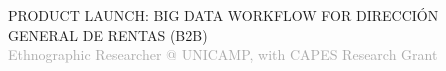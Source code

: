 \begin{cvtable}
%
	{
	}{
	 {\scriptsize PRODUCT LAUNCH: BIG DATA WORKFLOW FOR DIRECCIÓN GENERAL DE RENTAS
	 (B2B)
	 } \\
        }  
% 
%
%
	{%
	\textcolor{darkgray}{%
    Ethnographic Researcher \newline
    @ {\scriptsize UNICAMP},
    with
    {C\scriptsize APES}
    Research Grant
	}}
	{
	}
	{
}
\end{cvtable}
